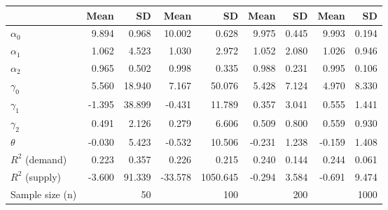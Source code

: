 
\begin{tabular}[t]{lrrrrrrrr}
\toprule
  & Mean & SD & Mean  & SD  & Mean   & SD   & Mean    & SD   \\
\midrule
$\alpha_{0}$ & 9.894 & 0.968 & 10.002 & 0.628 & 9.975 & 0.445 & 9.993 & 0.194\\
$\alpha_{1}$ & 1.062 & 4.523 & 1.030 & 2.972 & 1.052 & 2.080 & 1.026 & 0.946\\
$\alpha_{2}$ & 0.965 & 0.502 & 0.998 & 0.335 & 0.988 & 0.231 & 0.995 & 0.106\\
$\gamma_{0}$ & 5.560 & 18.940 & 7.167 & 50.076 & 5.428 & 7.124 & 4.970 & 8.330\\
$\gamma_{1}$ & -1.395 & 38.899 & -0.431 & 11.789 & 0.357 & 3.041 & 0.555 & 1.441\\
$\gamma_{2}$ & 0.491 & 2.126 & 0.279 & 6.606 & 0.509 & 0.800 & 0.559 & 0.930\\
$\theta$ & -0.030 & 5.423 & -0.532 & 10.506 & -0.231 & 1.238 & -0.159 & 1.408\\
$R^{2}$ (demand) & 0.223 & 0.357 & 0.226 & 0.215 & 0.240 & 0.144 & 0.244 & 0.061\\
$R^{2}$ (supply) & -3.600 & 91.339 & -33.578 & 1050.645 & -0.294 & 3.584 & -0.691 & 9.474\\
Sample size (n) &  & 50 &  & 100 &  & 200 &  & 1000\\
\bottomrule
\end{tabular}
